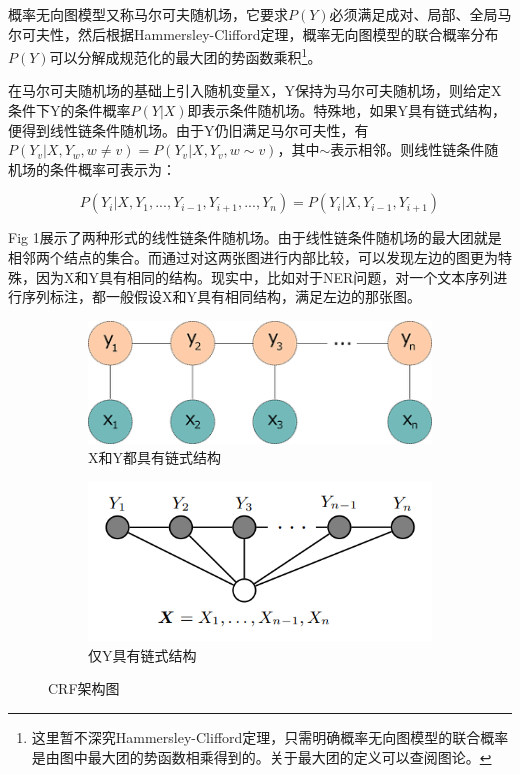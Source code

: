 \documentclass[]{article}
\begin{document}
概率无向图模型又称马尔可夫随机场，它要求$P(Y)$必须满足成对、局部、全局马尔可夫性，然后根据Hammersley-Clifford定理，概率无向图模型的联合概率分布$P(Y)$可以分解成规范化的最大团的势函数乘积\footnote{这里暂不深究Hammersley-Clifford定理，只需明确概率无向图模型的联合概率是由图中最大团的势函数相乘得到的。关于最大团的定义可以查阅图论。}。

在马尔可夫随机场的基础上引入随机变量X，Y保持为马尔可夫随机场，则给定X条件下Y的条件概率$P(Y|X)$即表示条件随机场。特殊地，如果Y具有链式结构，便得到线性链条件随机场。由于Y仍旧满足马尔可夫性，有$P(Y_v|X, Y_w, w \neq v) = P(Y_v|X, Y_v, w \sim v)$，其中$\sim$表示相邻。则线性链条件随机场的条件概率可表示为：

\begin{equation}\label{key}
	P(Y_i|X, Y_1, ..., Y_{i-1}, Y_{i+1}, ..., Y_n) = P(Y_i|X, Y_{i-1}, Y_{i+1})
\end{equation}

Fig 1展示了两种形式的线性链条件随机场。由于线性链条件随机场的最大团就是相邻两个结点的集合。而通过对这两张图进行内部比较，可以发现左边的图更为特殊，因为X和Y具有相同的结构。现实中，比如对于NER问题，对一个文本序列进行序列标注，都一般假设X和Y具有相同结构，满足左边的那张图。

\begin{figure}[h]
	\begin{subfigure}{0.5\textwidth}
		\includegraphics[width=0.9\linewidth]{../images/crf_2}
		\caption{X和Y都具有链式结构}
		\label{fig:subim2}
	\end{subfigure}
	\begin{subfigure}{0.5\textwidth}
		\includegraphics[width=0.9\linewidth]{../images/crf} 
		\caption{仅Y具有链式结构}
		\label{fig:subim1}
	\end{subfigure}
\caption{CRF架构图}
\label{fig:image2}
\end{figure}
\end{document}
